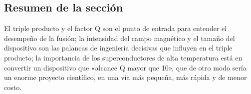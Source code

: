 \subsection{Resumen de la sección}

El triple producto y el factor Q son el punto de entrada para entender el desempeño de la fusión; la intensidad del campo magnético y el tamaño del dispositivo son las palancas de ingeniería decisivas que influyen en el triple producto; la importancia de los superconductores de alta temperatura está en convertir un dispositivo que «alcance Q mayor que 10», que de otro modo sería un enorme proyecto científico, en una vía más pequeña, más rápida y de menor costo.
